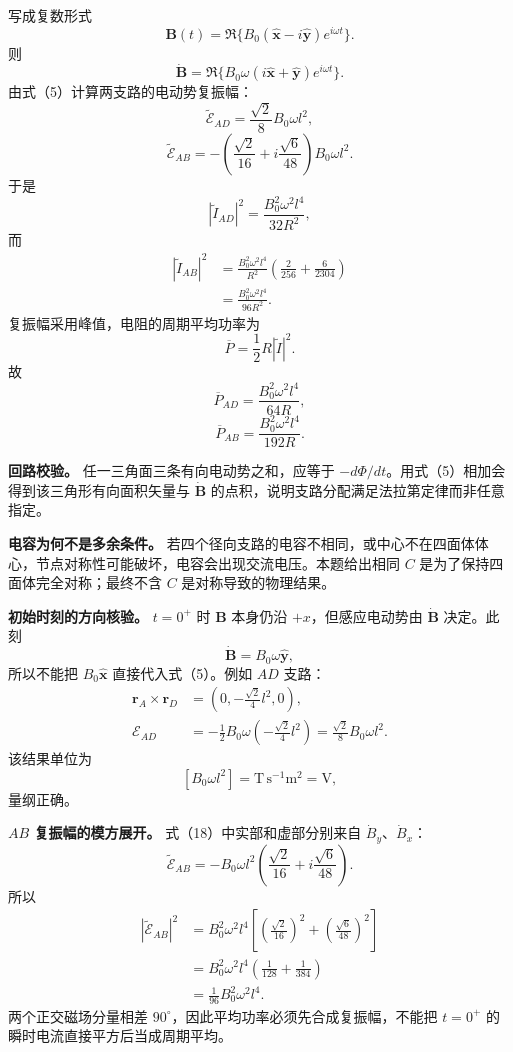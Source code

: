 \documentclass[12pt,a4paper,UTF8]{ctexart}
\begin{document}
写成复数形式 \[
\bm B(t)=\Re\{B_0(\hat{\bm x}-i\hat{\bm y})e^{i\omega t}\}. \tag{15}
\] 则 \[
\dot{\bm B}
=\Re\{B_0\omega(i\hat{\bm x}+\hat{\bm y})e^{i\omega t}\}. \tag{16}
\] 由式（5）计算两支路的电动势复振幅： \[
\widetilde{\mathcal E}_{AD}
=\frac{\sqrt2}{8}B_0\omega l^2, \tag{17}
\] \[
\widetilde{\mathcal E}_{AB}
=-\left(\frac{\sqrt2}{16}+i\frac{\sqrt6}{48}\right)B_0\omega l^2. \tag{18}
\] 于是 \[
|\widetilde I_{AD}|^2
=\frac{B_0^2\omega^2l^4}{32R^2}, \tag{19}
\] 而 \[
\begin{aligned}
|\widetilde I_{AB}|^2
&=\frac{B_0^2\omega^2l^4}{R^2}
\left(\frac2{256}+\frac6{2304}\right)\\
&=\frac{B_0^2\omega^2l^4}{96R^2}.
\end{aligned} \tag{20}
\] 复振幅采用峰值，电阻的周期平均功率为 \[
\overline P=\frac12R|\widetilde I|^2. \tag{21}
\] 故 \[
\boxed{
\overline P_{AD}=\frac{B_0^2\omega^2l^4}{64R}
}, \tag{22}
\] \[
\boxed{
\overline P_{AB}=\frac{B_0^2\omega^2l^4}{192R}
}. \tag{23}
\]

\textbf{回路校验。} 任一三角面三条有向电动势之和，应等于
\(-d\Phi/dt\)。用式（5）相加会得到该三角形有向面积矢量与 \(\dot{\bm B}\)
的点积，说明支路分配满足法拉第定律而非任意指定。

\textbf{电容为何不是多余条件。}
若四个径向支路的电容不相同，或中心不在四面体体心，节点对称性可能破坏，电容会出现交流电压。本题给出相同
\(C\) 是为了保持四面体完全对称；最终不含 \(C\) 是对称导致的物理结果。

\textbf{初始时刻的方向核验。} \(t=0^+\) 时 \(\bm B\) 本身仍沿
\(+x\)，但感应电动势由 \(\dot{\bm B}\) 决定。此刻 \[
\dot{\bm B}=B_0\omega\hat{\bm y},
\] 所以不能把 \(B_0\hat{\bm x}\) 直接代入式（5）。例如 \(AD\) 支路： \[
\begin{aligned}
\bm r_A\times\bm r_D
&=\left(0,-\frac{\sqrt2}{4}l^2,0\right),\\
\mathcal E_{AD}
&=-\frac12B_0\omega
\left(-\frac{\sqrt2}{4}l^2\right)
=\frac{\sqrt2}{8}B_0\omega l^2.
\end{aligned}
\] 该结果单位为 \[
[B_0\omega l^2]
=\mathrm{T\,s^{-1}m^2}
=\mathrm{V},
\] 量纲正确。

\textbf{\(AB\) 复振幅的模方展开。} 式（18）中实部和虚部分别来自
\(\dot B_y\)、\(\dot B_x\)： \[
\widetilde{\mathcal E}_{AB}
=-B_0\omega l^2
\left(\frac{\sqrt2}{16}+i\frac{\sqrt6}{48}\right).
\] 所以 \[
\begin{aligned}
|\widetilde{\mathcal E}_{AB}|^2
&=B_0^2\omega^2l^4
\left[\left(\frac{\sqrt2}{16}\right)^2
+\left(\frac{\sqrt6}{48}\right)^2\right]\\
&=B_0^2\omega^2l^4
\left(\frac1{128}+\frac1{384}\right)\\
&=\frac1{96}B_0^2\omega^2l^4.
\end{aligned}
\] 两个正交磁场分量相差
\(90^\circ\)，因此平均功率必须先合成复振幅，不能把 \(t=0^+\)
的瞬时电流直接平方后当成周期平均。
\end{document}
